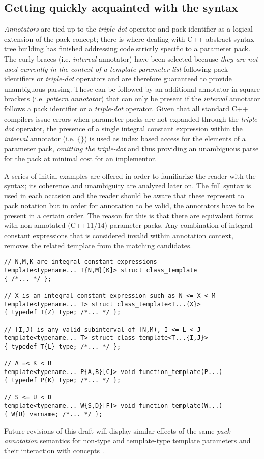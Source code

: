 \subsection{Getting quickly acquainted with the syntax}
\p \textit{Annotators} are tied up to the \textit{triple-dot} operator and pack identifier as a logical extension of the pack concept; there is where dealing with C++ abstract syntax tree building has finished addressing code strictly specific to a parameter pack.
The curly braces (i.e. \textit{interval} annotator) have been selected because \textit{they are not used currently in the context of a template parameter list} following pack identifiers or \textit{triple-dot} operators and are therefore guaranteed to provide unambiguous parsing.
These can be followed by an additional annotator in square brackets (i.e. \textit{pattern annotator}) that can only be present if the \textit{interval} annotator follows a pack identifier or a \textit{triple-dot} operator.
Given that all standard C++ compilers issue errors when parameter packs are not expanded through the \textit{triple-dot} operator, the presence of a single integral constant expression within the \textit{interval} annotator (i.e. $\{\}$) is used as index based access for the elements of a parameter pack, \textit{omitting the triple-dot} and thus providing an unambiguous parse for the pack at minimal cost for an implementor.

\p A series of initial examples are offered in order to familiarize the reader with the syntax; its coherence and unambiguity are analyzed later on.
The full syntax is used in each occasion and the reader should be aware that these represent  to pack notation but in order for annotation to be valid, the annotators have to be present in a certain order.
The reason for this is that there are equivalent forms with non-annotated (C++11/14) parameter packs.
Any combination of integral constant expressions that is considered invalid within annotation context, removes the related template from the matching candidates.

\begin{verbatim}
// N,M,K are integral constant expressions
template<typename... T{N,M}[K]> struct class_template
{ /*... */ };

// X is an integral constant expression such as N <= X < M
template<typename... T> struct class_template<T...{X}>
{ typedef T{Z} type; /*... */ };

// [I,J) is any valid subinterval of [N,M), I <= L < J
template<typename... T> struct class_template<T...{I,J}>
{ typedef T{L} type; /*... */ };

// A =< K < B
template<typename... P{A,B}[C]> void function_template(P...)
{ typedef P{K} type; /*... */ };

// S <= U < D
template<typename... W{S,D}[F]> void function_template(W...)
{ W{U} varname; /*... */ };

\end{verbatim}

\p Future revisions of this draft will display similar effects of the same \textit{pack annotation} semantics for non-type and template-type template parameters and their interaction with concepts \cite{Stroustrup2012,Sutton2013}.